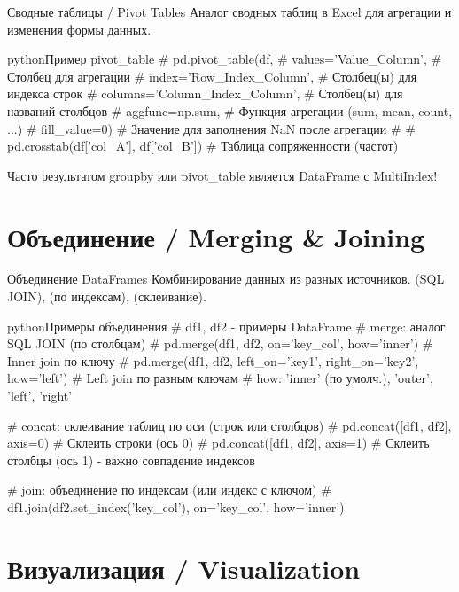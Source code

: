 \begin{alerttextbox}{Сводные таблицы / Pivot Tables}
Аналог сводных таблиц в Excel для агрегации и изменения формы данных.
\begin{codebox}{python}{Пример pivot\_table}
# pd.pivot_table(df,
#                values='Value_Column', # Столбец для агрегации
#                index='Row_Index_Column', # Столбец(ы) для индекса строк
#                columns='Column_Index_Column', # Столбец(ы) для названий столбцов
#                aggfunc=np.sum, # Функция агрегации (sum, mean, count, ...)
#                fill_value=0) # Значение для заполнения NaN после агрегации
#
# pd.crosstab(df['col_A'], df['col_B']) # Таблица сопряженности (частот)
\end{codebox}
\alert{Часто результатом groupby или pivot\_table является DataFrame с MultiIndex!}
\end{alerttextbox}

\section{Объединение / Merging \& Joining}

\begin{textbox}{Объединение DataFrames}
Комбинирование данных из разных источников.  (SQL JOIN),  (по индексам),  (склеивание).

\begin{codebox}{python}{Примеры объединения}
# df1, df2 - примеры DataFrame
# merge: аналог SQL JOIN (по столбцам)
# pd.merge(df1, df2, on='key_col', how='inner') # Inner join по ключу
# pd.merge(df1, df2, left_on='key1', right_on='key2', how='left') # Left join по разным ключам
# how: 'inner' (по умолч.), 'outer', 'left', 'right'

# concat: склеивание таблиц по оси (строк или столбцов)
# pd.concat([df1, df2], axis=0) # Склеить строки (ось 0)
# pd.concat([df1, df2], axis=1) # Склеить столбцы (ось 1) - важно совпадение индексов

# join: объединение по индексам (или индекс с ключом)
# df1.join(df2.set_index('key_col'), on='key_col', how='inner')
\end{codebox}
\end{textbox}

\section{Визуализация / Visualization}

